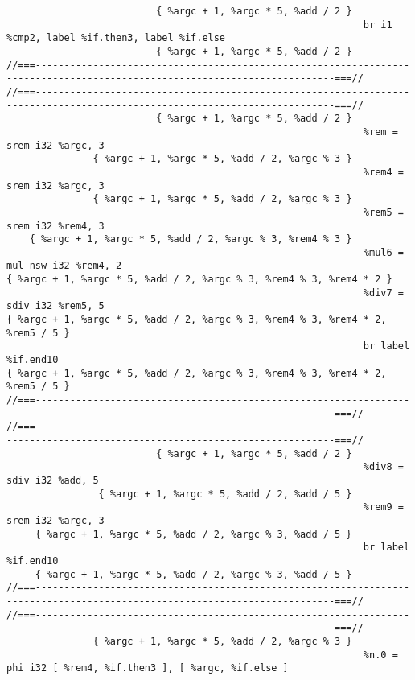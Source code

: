 \begin{verbatim}
                          { %argc + 1, %argc * 5, %add / 2 }
                                                              br i1 %cmp2, label %if.then3, label %if.else
                          { %argc + 1, %argc * 5, %add / 2 }
//===--------------------------------------------------------------------------------------------------------------------------===//
//===--------------------------------------------------------------------------------------------------------------------------===//
                          { %argc + 1, %argc * 5, %add / 2 }
                                                              %rem = srem i32 %argc, 3
               { %argc + 1, %argc * 5, %add / 2, %argc % 3 }
                                                              %rem4 = srem i32 %argc, 3
               { %argc + 1, %argc * 5, %add / 2, %argc % 3 }
                                                              %rem5 = srem i32 %rem4, 3
    { %argc + 1, %argc * 5, %add / 2, %argc % 3, %rem4 % 3 }
                                                              %mul6 = mul nsw i32 %rem4, 2
{ %argc + 1, %argc * 5, %add / 2, %argc % 3, %rem4 % 3, %rem4 * 2 }
                                                              %div7 = sdiv i32 %rem5, 5
{ %argc + 1, %argc * 5, %add / 2, %argc % 3, %rem4 % 3, %rem4 * 2, %rem5 / 5 }
                                                              br label %if.end10
{ %argc + 1, %argc * 5, %add / 2, %argc % 3, %rem4 % 3, %rem4 * 2, %rem5 / 5 }
//===--------------------------------------------------------------------------------------------------------------------------===//
//===--------------------------------------------------------------------------------------------------------------------------===//
                          { %argc + 1, %argc * 5, %add / 2 }
                                                              %div8 = sdiv i32 %add, 5
                { %argc + 1, %argc * 5, %add / 2, %add / 5 }
                                                              %rem9 = srem i32 %argc, 3
     { %argc + 1, %argc * 5, %add / 2, %argc % 3, %add / 5 }
                                                              br label %if.end10
     { %argc + 1, %argc * 5, %add / 2, %argc % 3, %add / 5 }
//===--------------------------------------------------------------------------------------------------------------------------===//
//===--------------------------------------------------------------------------------------------------------------------------===//
               { %argc + 1, %argc * 5, %add / 2, %argc % 3 }
                                                              %n.0 = phi i32 [ %rem4, %if.then3 ], [ %argc, %if.else ]

\end{verbatim}
